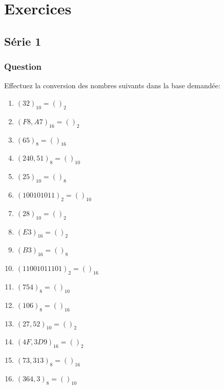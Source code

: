 \documentclass[11pt]{article}
\begin{document}
\section{Exercices}
\label{sec:orged000ce}

\subsection*{Série 1}
\label{sec:org24cf0ca}
\subsubsection*{Question}
\label{sec:org6599694}
Effectuez la conversion des nombres suivants dans la base demandée:

\begin{enumerate}
\item \((32)_{10} = ( )_{2}\)

\item \((F8,A7)_{16} = ( )_{2}\)

\item \((65)_{8} = ( )_{16}\)

\item \((240,51)_{8} = ( )_{10}\)

\item \((25)_{10} = ( )_{8}\)

\item \((100101011)_{2} = ( )_{10}\)

\item \((28)_{10} = ( )_{2}\)

\item \((E3)_{16} = ( )_{2}\)

\item \((B3)_{16} = ( )_{8}\)

\item \((11001011101)_{2} = ( )_{16}\)

\item \((754)_{8} = ( )_{10}\)

\item \((106)_{8} = ( )_{16}\)

\item \((27,52)_{10} = ( )_{2}\)

\item \((4F,3D9)_{16} = ( )_{2}\)

\item \((73,313)_{8} = ( )_{16}\)

\item \((364,3)_{8} = ( )_{10}\)


\end{enumerate}
\end{document}
